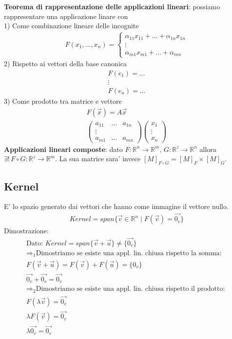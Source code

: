 \documentclass[10pt]{extarticle}
\begin{document}
\textbf{Teorema di rappresentazione delle applicazioni lineari}: possiamo rappresentare una applicazione linare con \\
1) Come combinazione lineare delle incognite
\begin{align*}
    F(x_1,\dots,x_n)=\begin{cases}
        \alpha_{11} x_{11}+\dots+\alpha_{1n}x_{1n}\\
        \vdots \\
        \alpha_{m1} x_{m1}+\dots+\alpha_{mn}
    \end{cases}
\end{align*}
2) Rispetto ai vettori della base canonica
\begin{align*}
    F(e_1)=\dots \\
    \vdots \\
    F(e_n)=\dots
\end{align*}
3) Come prodotto tra matrice e vettore
\begin{align*}
    F(\vec{x})=A\vec{x} \\
    \begin{pmatrix}
        a_{11} & \dots & a_{1n} \\
        \vdots \\
        a_{m1} & \dots & a_{mn}
    \end{pmatrix}\begin{pmatrix}
        x_1 \\ \vdots \\ x_n
    \end{pmatrix}
\end{align*}
\vspace{1em}
\textbf{Applicazioni lineari composte}: dato $F : \mathbb{R}^n \to \mathbb{R}^m, \, G : \mathbb{R}^z \to \mathbb{R}^n$ allora $\exists! \, F \circ G :  \mathbb{R}^z \to \mathbb{R}^m$. La sua matrice sara' invece $[M]_{F \circ G}=[M]_F \times [M]_G$.
\vspace{2em}
\subsection{Kernel} 
E' lo spazio generato dai vettori che hanno come immagine il vettore nullo.
\begin{align*}
    Kernel=span\{\vec{v} \in \mathbb{R}^n \mid F(\vec{v})={\vec{0_v}}\}
\end{align*}
Dimostrazione:
\begin{align*}
    \text{Dato: } Kernel=span\{\vec{v}+\vec{u}\}\neq\{\vec{0_v}\} \\
    \Rightarrow_1 \text{Dimostriamo se esiste una appl. lin. chiusa rispetto la somma: } \\
    F(\vec{v}+\vec{u})=F(\vec{v})+F(\vec{u})=\{0_v\}\\
    \vec{0_v}+\vec{0_v}=\vec{0_v} \\
    \Rightarrow_2 \text{Dimostriamo se esiste una appl. lin. chiusa rispetto il prodotto: } \\
    F(\lambda\vec{v})=\vec{0_v} \\
    \lambda F(\vec{v})=\vec{0_v} \\
    \lambda \vec{0_v}=\vec{0_v}
\end{align*}
\end{document}

